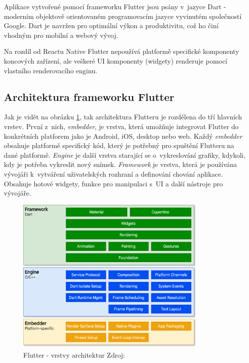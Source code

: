 Aplikace vytvořené pomocí frameworku Flutter jsou psány v~jazyce Dart - moderním objektově orientovaném programovacím jazyce 
vyvinutém společností Google. Dart je navržen pro optimální výkon a produktivitu, což ho činí vhodným pro mobilní a
webový vývoj. \cite{dart}

Na rozdíl od Reactu Native Flutter nepoužívá platformě specifické komponenty koncových zařízení, ale veškeré UI komponenty (widgety)
renderuje pomocí vlastního renderovacího enginu. \cite{flutterRenderingModel}


\subsection*{Architektura frameworku Flutter} 
Jak je vidět na obrázku \ref{fig:flutter_architectural_layers}, tak architektura Flutteru je rozdělena do tří hlavních vrstev. \cite{flutterArchOverview}
První z~nich, \textit{embedder}, je vrstva, která umožňuje integrovat Flutter do konkrétních platforem jako je Android, iOS, desktop nebo web. 
Každý \textit{embedder} obsahuje platformě specifický kód, který je potřebný pro spuštění Flutteru na dané platformě.
\textit{Engine} je další vrstva starající se o~vykreslování grafiky, kdykoli, kdy je potřeba vykreslit nový snímek. \cite{flutterArchOverview} 
\textit{Framework} je vrstva, která je používána vývojáři k~vytváření uživatelských rozhraní a definování chování aplikace. 
Obsahuje hotové widgety, funkce pro manipulaci s~UI a další nástroje pro vývojáře. \cite{flutterArchOverview} 


\begin{figure}[H]
  \centering
  \includegraphics[width=0.85\textwidth]{flutter_architectural_layers.png}
  \caption{Flutter - vrstvy architektur Zdroj: \cite{flutterUI}}
  \label{fig:flutter_architectural_layers}
\end{figure}

